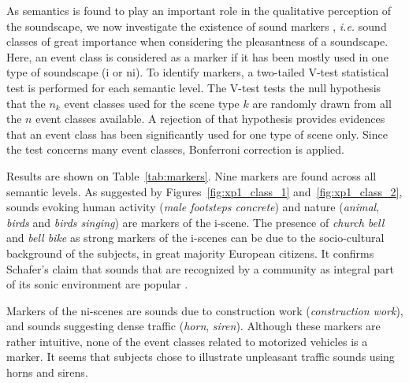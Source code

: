 \documentclass[twoside,twocolumn]{article}
\begin{document}
As semantics is found to play an important role in the qualitative perception of the soundscape, we now investigate the existence of sound markers  , \textit{i.e.} sound classes of great importance when considering the pleasantness of a soundscape. Here, an event class is considered as a marker if it has been mostly used in one type of soundscape (i or ni). To identify markers, a two-tailed V-test statistical test is performed for each semantic level. The V-test tests the null hypothesis that the $n_k$ event classes used for the scene type $k$ are randomly drawn from all the $n$ event classes available. A rejection of that hypothesis provides evidences that an event class has been significantly used for one type of scene only. Since the test concerns many event classes, Bonferroni correction is applied.

Results are shown on Table~\ref{tab:markers}. Nine markers are found across all semantic levels. As suggested by Figures~\ref{fig:xp1_class_1} and~\ref{fig:xp1_class_2}, sounds evoking human activity (\textit{male footsteps concrete}) and nature (\textit{animal}, \textit{birds} and \textit{birds singing}) are markers of the i-scene. The presence of \textit{church bell} and \textit{bell bike} as strong markers of the i-scenes can be due to the socio-cultural background of the subjects, in great majority European citizens. It confirms Schafer's claim that sounds that are recognized by a community as integral part of its sonic environment are popular \cite{schafer1977tuning}. 

Markers of the ni-scenes are sounds due to construction work (\textit{construction work}), and sounds suggesting dense traffic (\textit{horn}, \textit{siren}). Although these markers are rather intuitive, none of the event classes related to motorized vehicles is a marker. It seems that subjects chose to illustrate unpleasant traffic sounds using horns and sirens.
\end{document}
